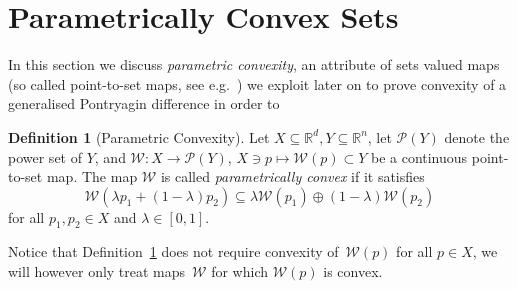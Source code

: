 \documentclass[journal]{IEEEtran}
\newcounter{thmcount}
\theoremstyle{remark}
\theoremstyle{definition}
\newtheorem{defi}[thmcount]{Definition}
\begin{document}
\section{Parametrically Convex Sets}\label{sec:p:convex:sets}
In this section we discuss \emph{parametric convexity}, an attribute of sets valued maps 
(so called point-to-set maps, see e.g.~\cite{Hogan:1973}) we exploit later on to prove 
convexity of a generalised Pontryagin difference in order to 
%
\begin{defi}[Parametric Convexity]\label{def:parametric:convexity}
  Let $X\subseteq\mathbb R^d, Y\subseteq\mathbb R^n$, let $\mathscr P(Y)$ 
  denote the power set of $Y$, 
  and $\mathcal W:X\rightarrow \mathscr P(Y)$, $X\ni p\mapsto \mathcal W(p)
  \subset Y$ be a continuous point-to-set map. The map $\mathcal W$ is called 
  \emph{parametrically convex} if it satisfies
%
  \begin{equation}\label{eq:def:parametrically:convex}
  \mathcal W(\lambda p_1 + (1-\lambda)p_2)\subseteq\lambda \mathcal W(p_1) \oplus (1-\lambda) \mathcal W(p_2)
  \end{equation}
%
  for all $p_1,p_2\in X$ and $\lambda\in[0,1]$.
\end{defi}
%
Notice that Definition~\ref{def:parametric:convexity} does not require convexity of~$\mathcal W(p)$ for all
$p\in X$, we will however only treat maps~$\mathcal W$ for which $\mathcal W(p)$ is convex.
\end{document}

